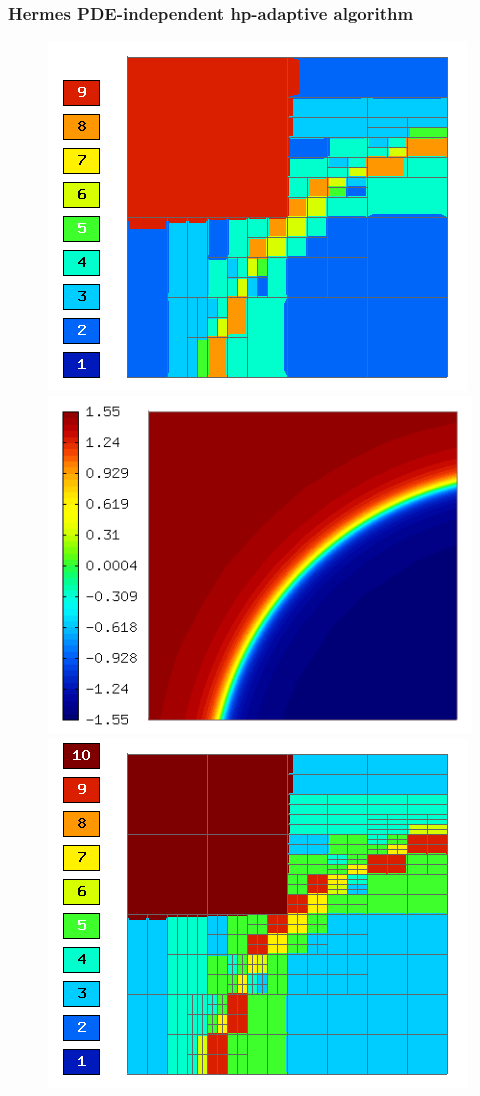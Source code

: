 \documentclass{beamer}
\begin{document}
\begin{frame}
\frametitle{Hermes PDE-independent hp-adaptive algorithm}
\begin{center}
\vspace{0.77mm}
\begin{figure}[t]
\includegraphics[width=0.42\textheight]{refsln/screen002.png}
\includegraphics[width=0.42\textheight]{refsln/screen001.png}
\includegraphics[width=0.42\textheight]{refsln/screen003.png}

\end{figure}
\end{center}
\end{frame}
\end{document}
